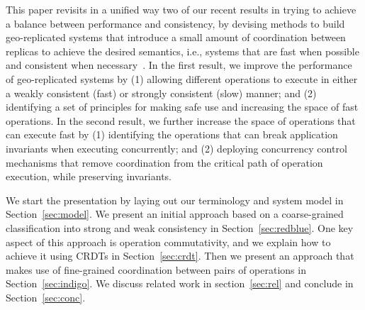 This paper revisits in a unified way two of our recent results in trying to achieve a balance between performance and consistency, by devising methods to build geo-replicated systems that introduce a small amount of coordination between replicas to achieve the desired semantics, i.e., systems that are fast when possible and consistent when necessary~\cite{Li2012RedBlue, Balegas2015Indigo}.
In the first result, we improve the performance of geo-replicated systems by (1) allowing different operations to execute in either a weakly consistent (fast) or strongly consistent (slow) manner; and (2) identifying a set of principles for making safe use
and increasing the space of fast operations.
In the second result, we further increase the space of operations that can execute fast by (1) identifying the operations that can break application invariants when executing concurrently; and (2) deploying concurrency control mechanisms that remove coordination from the critical path of operation execution, while preserving invariants.

We start the presentation by laying out our terminology and system model in Section~\ref{sec:model}. We present an initial approach based on a coarse-grained classification into strong and weak consistency in Section~\ref{sec:redblue}. One key aspect of this approach is operation commutativity, and we explain how to achieve it using CRDTs in Section~\ref{sec:crdt}. Then we present an approach that makes use of fine-grained coordination between pairs of operations in Section~\ref{sec:indigo}. We discuss related work in section~\ref{sec:rel} and conclude in Section~\ref{sec:conc}.
